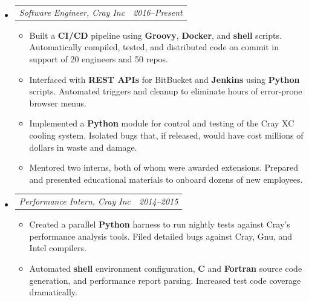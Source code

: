 \documentclass[12pt,letterpaper]{article}
\makeatletter
\newcommand{\headerpair}[2]{
    \begin{tabular*}{\linewidth}{l@{ \extracolsep{\fill} }r} {\large\emph{#1}} & {\large\emph{#2}}
    \end{tabular*}
}
\newcommand{\headerrow}[3]{\headerpair{#1, #2}{#3}}
\newcommand{\YearRange}[2]{#1--#2}
\newcommand{\CPP}{C\nolinebreak[4]\hspace{-.05em}\raisebox{.22ex}{\footnotesize\bf ++}\xspace}
\makeatother
\begin{document}
\begin{itemize}[leftmargin=\parindent]
    \parskip=0.1em
    \itemsep=1.2em
    \item[]
        \headerrow
            {Software Engineer}
            {Cray Inc}
            {\YearRange{2016}{Present}}
        \begin{itemize}[leftmargin=\parindent]
            \item Built a \textbf{CI/CD} pipeline using \textbf{Groovy}, \textbf{Docker}, and \textbf{shell} scripts. Automatically compiled, tested, and distributed code on commit in support of 20 engineers and 50 repos.
            \item Interfaced with \textbf{REST APIs} for BitBucket and \textbf{Jenkins} using \textbf{Python} scripts. Automated triggers and cleanup to eliminate hours of error-prone browser menus.
            \item Implemented a \textbf{Python} module for control and testing of the Cray XC cooling system. Isolated bugs that, if released, would have cost millions of dollars in waste and damage.
            \item Mentored two interns, both of whom were awarded extensions. Prepared and presented educational materials to onboard dozens of new employees.
        \end{itemize}
    \item[]
        \headerrow
            {Performance Intern}
            {Cray Inc}
            {\YearRange{2014}{2015}}
        \begin{itemize}[leftmargin=\parindent]
            \item Created a parallel \textbf{Python} harness to run nightly tests against Cray's performance analysis tools. Filed detailed bugs against Cray, Gnu, and Intel compilers.
            \item Automated \textbf{shell} environment configuration, \textbf{\CPP} and \textbf{Fortran} source code generation, and performance report parsing. Increased test code coverage dramatically.

\end{itemize}
\end{itemize}
\end{document}
